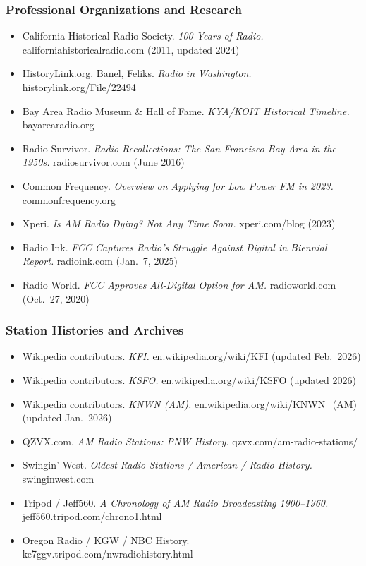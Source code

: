 \documentclass[11pt,letterpaper]{article}
\begin{document}
\begin{asciibox}
\subsubsection{Professional Organizations and Research}
\begin{itemize}[leftmargin=*]
  \item California Historical Radio Society. \textit{100 Years of Radio.} californiahistoricalradio.com (2011, updated 2024)
  \item HistoryLink.org. Banel, Feliks. \textit{Radio in Washington.} historylink.org/File/22494
  \item Bay Area Radio Museum \& Hall of Fame. \textit{KYA/KOIT Historical Timeline.} bayarearadio.org
  \item Radio Survivor. \textit{Radio Recollections: The San Francisco Bay Area in the 1950s.} radiosurvivor.com (June 2016)
  \item Common Frequency. \textit{Overview on Applying for Low Power FM in 2023.} commonfrequency.org
  \item Xperi. \textit{Is AM Radio Dying? Not Any Time Soon.} xperi.com/blog (2023)
  \item Radio Ink. \textit{FCC Captures Radio's Struggle Against Digital in Biennial Report.} radioink.com (Jan.\ 7, 2025)
  \item Radio World. \textit{FCC Approves All-Digital Option for AM.} radioworld.com (Oct.\ 27, 2020)
\end{itemize}

\subsubsection{Station Histories and Archives}
\begin{itemize}[leftmargin=*]
  \item Wikipedia contributors. \textit{KFI.} en.wikipedia.org/wiki/KFI (updated Feb.\ 2026)
  \item Wikipedia contributors. \textit{KSFO.} en.wikipedia.org/wiki/KSFO (updated 2026)
  \item Wikipedia contributors. \textit{KNWN (AM).} en.wikipedia.org/wiki/KNWN\_(AM) (updated Jan.\ 2026)
  \item QZVX.com. \textit{AM Radio Stations: PNW History.} qzvx.com/am-radio-stations/
  \item Swingin' West. \textit{Oldest Radio Stations / American / Radio History.} swinginwest.com
  \item Tripod / Jeff560. \textit{A Chronology of AM Radio Broadcasting 1900--1960.} jeff560.tripod.com/chrono1.html
  \item Oregon Radio / KGW / NBC History. ke7ggv.tripod.com/nwradiohistory.html
\end{itemize}


\end{asciibox}
\end{document}
